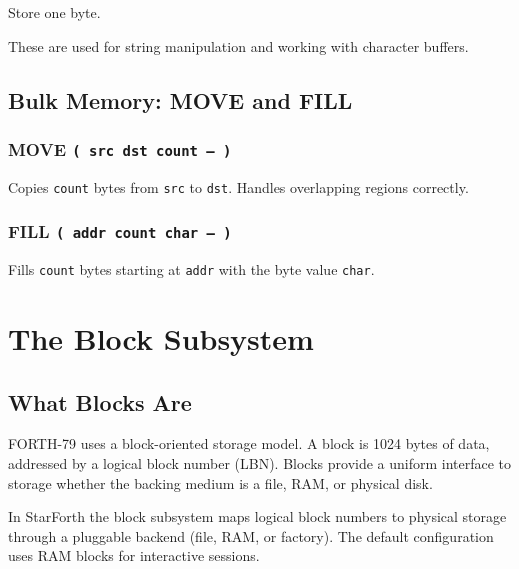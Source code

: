 Store one byte.

These are used for string manipulation and working with character buffers.

\section{Bulk Memory: MOVE and FILL}
\label{sec:move-fill}

\subsection*{MOVE \texttt{( src dst count -- )}}

Copies \texttt{count} bytes from \texttt{src} to \texttt{dst}. Handles
overlapping regions correctly.

\subsection*{FILL \texttt{( addr count char -- )}}

Fills \texttt{count} bytes starting at \texttt{addr} with the byte value
\texttt{char}.

\chapter{The Block Subsystem}
\label{chap:blocks}

\section{What Blocks Are}
\label{sec:blocks-what}

FORTH-79 uses a block-oriented storage model. A block is 1024 bytes of data,
addressed by a logical block number (LBN). Blocks provide a uniform interface
to storage whether the backing medium is a file, RAM, or physical disk.

In StarForth the block subsystem maps logical block numbers to physical storage
through a pluggable backend (file, RAM, or factory). The default configuration
uses RAM blocks for interactive sessions.

